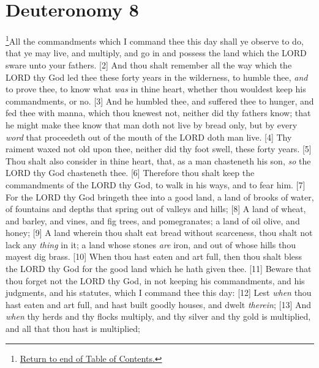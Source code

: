 \chapter{Deuteronomy 8}
\footnote{\textcolor[rgb]{0.00,0.25,0.00}{\hyperlink{DeuteronomyTOC}{Return to end of Table of Contents.}}}\textcolor[rgb]{0.00,0.00,1.00}{All the commandments which I command thee this day shall ye observe to do, that ye may live, and multiply, and go in and possess the land which the LORD sware unto your fathers.}
[2] \textcolor[rgb]{0.00,0.00,1.00}{And thou shalt remember all the way which the LORD thy God led thee these forty years in the wilderness, to humble thee, \emph{and} to prove thee, to know what \emph{was} in thine heart, whether thou wouldest keep his commandments, or no.}
[3] \textcolor[rgb]{0.00,0.00,1.00}{And he humbled thee, and suffered thee to hunger, and fed thee with manna, which thou knewest not, neither did thy fathers know; that he might make thee know that man doth not live by bread only, but by every \emph{word} that proceedeth out of the mouth of the LORD doth man live.}
[4] \textcolor[rgb]{0.00,0.00,1.00}{Thy raiment waxed not old upon thee, neither did thy foot swell, these forty years.}
[5] \textcolor[rgb]{0.00,0.00,1.00}{Thou shalt also consider in thine heart, that, as a man chasteneth his son, \emph{so} the LORD thy God chasteneth thee.}
[6] \textcolor[rgb]{0.00,0.00,1.00}{Therefore thou shalt keep the commandments of the LORD thy God, to walk in his ways, and to fear him.}
[7] \textcolor[rgb]{0.00,0.00,1.00}{For the LORD thy God bringeth thee into a good land, a land of brooks of water, of fountains and depths that spring out of valleys and hills;}
[8] \textcolor[rgb]{0.00,0.00,1.00}{A land of wheat, and barley, and vines, and fig trees, and pomegranates; a land of oil olive, and honey;}
[9] \textcolor[rgb]{0.00,0.00,1.00}{A land wherein thou shalt eat bread without scarceness, thou shalt not lack any \emph{thing} in it; a land whose stones \emph{are} iron, and out of whose hills thou mayest dig brass.}
[10] \textcolor[rgb]{0.00,0.00,1.00}{When thou hast eaten and art full, then thou shalt bless the LORD thy God for the good land which he hath given thee.}
[11] \textcolor[rgb]{0.00,0.00,1.00}{Beware that thou forget not the LORD thy God, in not keeping his commandments, and his judgments, and his statutes, which I command thee this day:}
[12] \textcolor[rgb]{0.00,0.00,1.00}{Lest \emph{when} thou hast eaten and art full, and hast built goodly houses, and dwelt \emph{therein};}
[13] \textcolor[rgb]{0.00,0.00,1.00}{And \emph{when} thy herds and thy flocks multiply, and thy silver and thy gold is multiplied, and all that thou hast is multiplied;}
